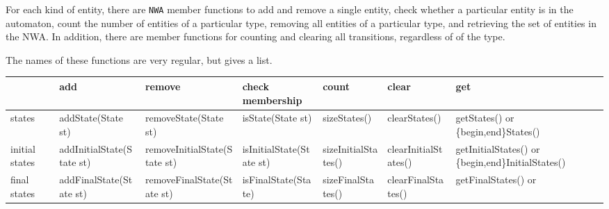 For each kind of entity, there are \texttt{NWA} member functions to add and
remove a single entity, check whether a particular entity is in the
automaton, count the number of entities of a particular type, removing all
entities of a particular type, and retrieving the set of entities in the
NWA. In addition, there are member functions for counting and clearing all
transitions, regardless of of the type.

The names of these functions are very regular, but
 gives a list.

\begin{sidewaystable}\sffamily\footnotesize
\begin{threeparttable}
\begin{tabular}{p{0.75in}p{1.55in}p{1.6in}p{1.35in}p{1.27in}p{1.2in}p{1.5in}}
\toprule
                 &  add\tnote{1}                            &  remove\tnote{1}                          &  check membership\tnote{3} &  count                &  clear                     &  get\tnote{4}                 \\
\hline\hline %
states           &  addState(State st)                      &  removeState(State st)\tnote{5}           &  isState(State st)         &  sizeStates()         &  clearStates()\tnote{5}    &  getStates() or \newline
                                                                                                                                                                                             \{begin,end\}States()        \\
initial \newline
states           &  addInitialState(State st)               &  removeInitialState(State st)             &  isInitialState(State st)  &  sizeInitialStates()  &  clearInitialStates()      &  getInitialStates() or \newline
                                                                                                                                                                                             \{begin,end\}InitialStates() \\
final
\newline  states &  addFinalState(State st)                 &  removeFinalState(State st)               &  isFinalState(State)       &  sizeFinalStates()    &  clearFinalStates()        &  getFinalStates() or \newline

\end{tabular}
\end{threeparttable}
\end{sidewaystable}
